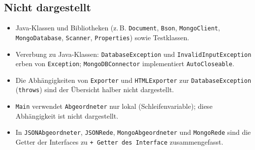 \subsection{Nicht dargestellt}
\begin{itemize}
    \item Java-Klassen und Bibliotheken (z.\,B. \texttt{Document}, \texttt{Bson}, \texttt{MongoClient}, \texttt{MongoDatabase}, \texttt{Scanner}, \texttt{Properties}) sowie Testklassen.
    \item Vererbung zu Java-Klassen: \texttt{DatabaseException} und \texttt{InvalidInputException} erben von \texttt{Exception}; \texttt{MongoDBConnector} implementiert \texttt{AutoCloseable}.
    \item Die Abhängigkeiten von \texttt{Exporter} und \texttt{HTMLExporter} zur \texttt{DatabaseException} (\texttt{throws}) sind der Übersicht halber nicht dargestellt.
    \item \texttt{Main} verwendet \texttt{Abgeordneter} nur lokal (Schleifenvariable); diese Abhängigkeit ist nicht dargestellt.
    \item In \texttt{JSONAbgeordneter}, \texttt{JSONRede}, \texttt{MongoAbgeordneter} und \texttt{MongoRede} sind die Getter der Interfaces zu \texttt{+ Getter des Interface} zusammengefasst.
\end{itemize}